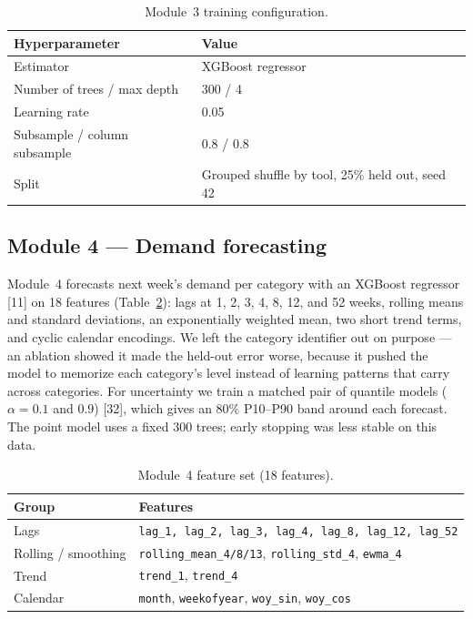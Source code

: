 \documentclass[12pt]{article}
\begin{document}
\begin{table}[H]
\caption{Module~3 training configuration.}
\label{tab:m3cfg}
\centering
\small
\begin{tabular}{@{}p{5.4cm}p{7.0cm}@{}}
\toprule
Hyperparameter & Value \\
\midrule
Estimator & XGBoost regressor \\
Number of trees / max depth & 300 / 4 \\
Learning rate & 0.05 \\
Subsample / column subsample & 0.8 / 0.8 \\
Split & Grouped shuffle by tool, 25\% held out, seed 42 \\
\bottomrule
\end{tabular}
\end{table}

\subsection{Module 4 --- Demand forecasting}

Module~4 forecasts next week's demand per category with an XGBoost regressor [11]
on 18 features (Table~\ref{tab:m4feat}): lags at 1, 2, 3, 4, 8, 12, and 52 weeks,
rolling means and standard deviations, an exponentially weighted mean, two short
trend terms, and cyclic calendar encodings. We left the category identifier out on
purpose --- an ablation showed it made the held-out error worse, because it pushed
the model to memorize each category's level instead of learning patterns that carry
across categories. For uncertainty we train a matched pair of quantile models
($\alpha = 0.1$ and $0.9$) [32], which gives an 80\% P10--P90 band around each
forecast. The point model uses a fixed 300 trees; early stopping was less stable on
this data.

\begin{table}[H]
\caption{Module~4 feature set (18 features).}
\label{tab:m4feat}
\centering
\small
\begin{tabular}{@{}p{3.0cm}p{9.4cm}@{}}
\toprule
Group & Features \\
\midrule
Lags & \texttt{lag\_1, lag\_2, lag\_3, lag\_4, lag\_8, lag\_12, lag\_52} \\
Rolling / smoothing & \texttt{rolling\_mean\_4/8/13}, \texttt{rolling\_std\_4}, \texttt{ewma\_4} \\
Trend & \texttt{trend\_1}, \texttt{trend\_4} \\
Calendar & \texttt{month}, \texttt{weekofyear}, \texttt{woy\_sin}, \texttt{woy\_cos} \\
\bottomrule
\end{tabular}
\end{table}
\end{document}

